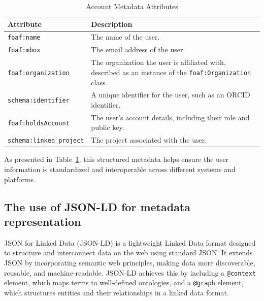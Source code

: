 \documentclass{article}
\begin{document}
\begin{table}[h]
      \centering
      \renewcommand{\arraystretch}{1.2}
      \begin{tabularx}{\textwidth}{|l|X|}
            \hline
            \textbf{Attribute}              & \textbf{Description}                                                                                            \\ \hline
            \texttt{foaf:name}              & The name of the user.                                                                                           \\ \hline
            \texttt{foaf:mbox}              & The email address of the user.                                                                                  \\ \hline
            \texttt{foaf:organization}      & The organization the user is affiliated with, described as an instance of the \texttt{foaf:Organization} class. \\ \hline
            \texttt{schema:identifier}      & A unique identifier for the user, such as an ORCID identifier.                                                  \\ \hline
            \texttt{foaf:holdsAccount}      & The user's account details, including their role and public key.                                                \\ \hline
            \texttt{schema:linked\_project} & The project associated with the user.                                                                           \\ \hline
      \end{tabularx}
      \caption{Account Metadata Attributes}
      \label{tab:user_metadata}
\end{table}

As presented in Table~\ref{tab:user_metadata}, this structured metadata helps ensure the user information is standardized and interoperable across different systems and platforms.


\subsection{The use of JSON-LD for metadata representation}

JSON for Linked Data (JSON-LD) is a lightweight Linked Data format designed to structure and interconnect data on the web using standard JSON. It extends JSON by incorporating semantic web principles, making data more discoverable, reusable, and machine-readable. JSON-LD achieves this by including a \texttt{@context} element, which maps terms to well-defined ontologies, and a \texttt{@graph} element, which structures entities and their relationships in a linked data format.
\end{document}
